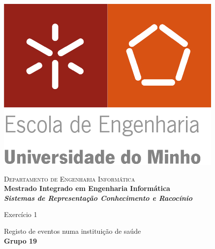 \begin{titlepage}


\begin{minipage}{0.3\textwidth}
\begin{flushleft} 
\includegraphics[width=\textwidth]{./logo.png}
\end{flushleft}
\end{minipage}
\begin{minipage}{0.6\textwidth}
\begin{flushright} 

\textsc{Departamento de Engenharia Informática}\\[0.1cm]
\bfseries Mestrado Integrado em Engenharia Informática \\ [0.1cm]
\bfseries \textit{Sistemas de Representação Conhecimento e Racocínio}\\[8mm]

\end{flushright}
\end{minipage}


\vspace{3cm}


\begin{center}


\LARGE Exercício 1

\Large Registo de eventos numa instituição de saúde\\[1.5cm]


{\Large \bfseries Grupo 19\\[2cm] }


\end{center}
\end{titlepage}
